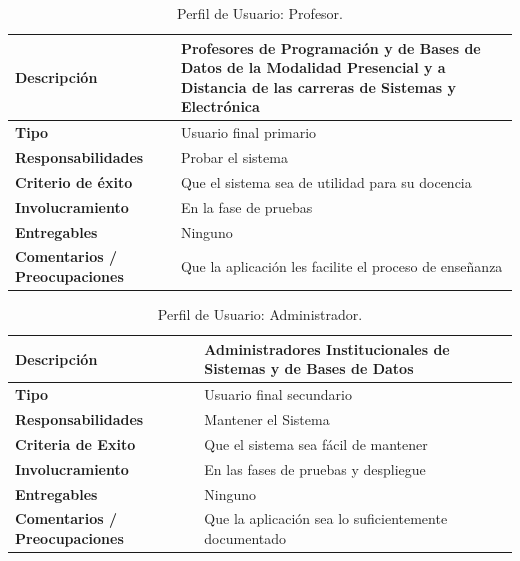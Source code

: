 \begin{table}[h!]
  \begin{tabular}{|p{}|p{}|}
    \hline
    \textbf{Descripción} & Profesores de Programación y de Bases de Datos de la Modalidad Presencial y a Distancia de las carreras de Sistemas y Electrónica \\
    \hline
    \textbf{Tipo} & Usuario final primario \\
    \hline
    \textbf{Responsabilidades} & Probar el sistema \\
    \hline
    \textbf{Criterio de éxito} & Que el sistema sea de utilidad para su docencia \\
    \hline
    \textbf{Involucramiento} & En la fase de pruebas \\
    \hline
    \textbf{Entregables} & Ninguno \\
    \hline
    \textbf{Comentarios / Preocupaciones} & Que la aplicación les facilite el proceso de enseñanza \\
    \hline
  \end{tabular}
  \caption{Perfil de Usuario: Profesor.}
  \label{per-user-prof}
\end{table}

\pagebreak

\begin{table}[h!]
  \begin{tabular}{|p{}|p{}|}
    \hline
    \textbf{Descripción} & Administradores Institucionales de Sistemas y de Bases de Datos \\
    \hline
    \textbf{Tipo} & Usuario final secundario \\
    \hline
    \textbf{Responsabilidades} & Mantener el Sistema \\
    \hline
    \textbf{Criteria de Exito} & Que el sistema sea fácil de mantener \\
    \hline
    \textbf{Involucramiento} & En las fases de pruebas y despliegue \\
    \hline
    \textbf{Entregables} & Ninguno \\
    \hline
    \textbf{Comentarios / Preocupaciones} & Que la aplicación sea lo suficientemente documentado \\
    \hline
  \end{tabular}
  \caption{Perfil de Usuario: Administrador.}
  \label{per-user-admn}
\end{table}

